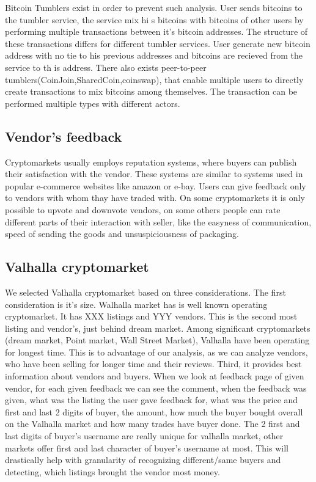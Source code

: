 \documentclass[
  digital, %
  table,   %
  lof,     %
  lot,     %
  oneside
]{fithesis3}
\begin{document}
Bitcoin Tumblers exist in order to prevent such analysis. User sends bitcoins to the tumbler service, the service mix hi
s bitcoins
with bitcoins of other users by performing multiple transactions between it's bitcoin addresses.
The structure of these transactions differs for different tumbler services.
User generate new bitcoin address with no tie to his previous addresses and bitcoins are recieved from the service to th
is address.
 There also exists peer-to-peer tumblers(CoinJoin,SharedCoin,coinswap),
that enable multiple users to directly create transactions to mix bitcoins among themselves.
The transaction can be performed multiple types with different actors.

\subsection{Vendor's feedback}

Cryptomarkets usually employs reputation systems, where buyers can publish their satisfaction with the vendor.
These systems are similar to systems used in popular e-commerce websites like amazon or e-bay.
Users can give feedback only to vendors with whom thay have traded with.
On some cryptomarkets it is only possible to upvote and downvote vendors, on some others people can
rate different parts of their interaction with seller, like the easyness of communication,
speed of sending the goods and unsuspiciousness of packaging.

\subsection{Valhalla cryptomarket}

We selected Valhalla cryptomarket based on three considerations.
The first consideration is it's size. Walhalla market has is well known operating cryptomarket. It has XXX listings and YYY vendors.
This is the second most listing and vendor's, just behind dream market.
Among significant cryptomarkets (dream market, Point market, Wall Street Market), Valhalla
have been operating for longest time. This is to advantage of our analysis, as we can 
analyze vendors, who have been selling for longer time and their reviews.
Third, it provides best information about vendors and buyers.
When we look at feedback page of given vendor, for each given feedback we can see the comment, when the feedback was given,
what was the listing the user gave feedback for, what was the price and first and last 2 digits of buyer,
the amount, how much the buyer bought overall on the Valhalla market and how many trades have buyer done.
The 2 first and last digits of buyer's username are really unique for valhalla market,
other markets offer first and last character of buyer's username at most.
This will drastically help with granularity of recognizing different/same buyers and detecting,
which listings brought the vendor most money.
\end{document}
